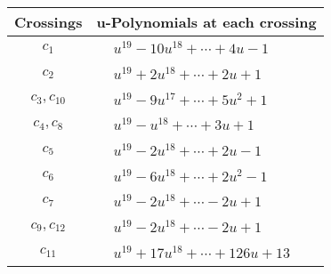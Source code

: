 \documentclass[1p]{elsarticle_modified}
\theoremstyle{definition}
\begin{document}
\begin{tabular}{m{50pt}|m{274pt}}
Crossings & \hspace{64pt}u-Polynomials at each crossing \\
\hline $$\begin{aligned}c_{1}\end{aligned}$$&$\begin{aligned}
&u^{19}-10 u^{18}+\cdots+4 u-1
\end{aligned}$\\
\hline $$\begin{aligned}c_{2}\end{aligned}$$&$\begin{aligned}
&u^{19}+2 u^{18}+\cdots+2 u+1
\end{aligned}$\\
\hline $$\begin{aligned}c_{3},c_{10}\end{aligned}$$&$\begin{aligned}
&u^{19}-9 u^{17}+\cdots+5 u^2+1
\end{aligned}$\\
\hline $$\begin{aligned}c_{4},c_{8}\end{aligned}$$&$\begin{aligned}
&u^{19}- u^{18}+\cdots+3 u+1
\end{aligned}$\\
\hline $$\begin{aligned}c_{5}\end{aligned}$$&$\begin{aligned}
&u^{19}-2 u^{18}+\cdots+2 u-1
\end{aligned}$\\
\hline $$\begin{aligned}c_{6}\end{aligned}$$&$\begin{aligned}
&u^{19}-6 u^{18}+\cdots+2 u^2-1
\end{aligned}$\\
\hline $$\begin{aligned}c_{7}\end{aligned}$$&$\begin{aligned}
&u^{19}-2 u^{18}+\cdots-2 u+1
\end{aligned}$\\
\hline $$\begin{aligned}c_{9},c_{12}\end{aligned}$$&$\begin{aligned}
&u^{19}-2 u^{18}+\cdots-2 u+1
\end{aligned}$\\
\hline $$\begin{aligned}c_{11}\end{aligned}$$&$\begin{aligned}
&u^{19}+17 u^{18}+\cdots+126 u+13
\end{aligned}$\\
\hline
\end{tabular}\\~\\
\end{document}
